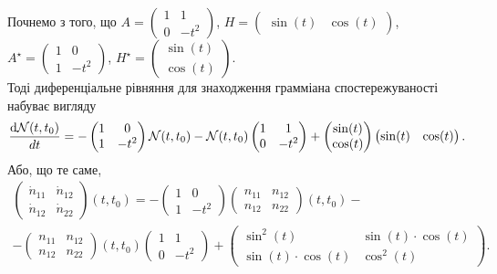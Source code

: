 \begin{solution}
    Почнемо з того, що $A = \begin{pmatrix} 1 & 1 \\ 0 & -t^2 \end{pmatrix}$, $H = \begin{pmatrix} \sin(t) & \cos(t) \end{pmatrix}$, $A^\star = \begin{pmatrix} 1 & 0 \\ 1 & -t^2 \end{pmatrix}$, $H^\star = \begin{pmatrix} \sin(t) \\ \cos(t) \end{pmatrix}$.\\
    
    Тоді диференціальне рівняння для знаходження грамміана спостережуваності набуває вигляду
    \[ \dfrac{\mathop{}\!\mathrm{d}\mathcal{N}(t, t_0)}{dt} = -\begin{pmatrix} 1 & 0 \\ 1 & -t^2 \end{pmatrix} \mathcal{N}(t, t_0) - \mathcal{N}(t, t_0) \begin{pmatrix} 1 & 1 \\ 0 & -t^2 \end{pmatrix} + \begin{pmatrix} \sin(t) \\ \cos(t) \end{pmatrix} \begin{pmatrix} \sin(t) & \cos(t) \end{pmatrix}. \]
    Або, що те саме,
    \begin{multline*}
        \begin{pmatrix} \dot n_{11} & \dot n_{12} \\ \dot n_{12} & \dot n_{22} \end{pmatrix} (t, t_0) = -\begin{pmatrix} 1 & 0 \\ 1 & -t^2 \end{pmatrix} \begin{pmatrix} n_{11} & n_{12} \\ n_{12} & n_{22} \end{pmatrix} (t, t_0) - \\ - \begin{pmatrix} n_{11} & n_{12} \\ n_{12} & n_{22} \end{pmatrix}(t, t_0) \begin{pmatrix} 1 & 1 \\ 0 & -t^2 \end{pmatrix} + \begin{pmatrix} \sin^2(t) & \sin(t)\cdot \cos(t) \\ \sin(t) \cdot \cos(t) & \cos^2(t) \end{pmatrix}.
    \end{multline*} 
    

\end{solution}
